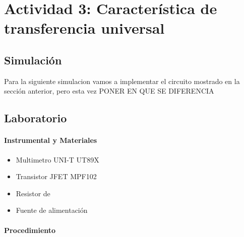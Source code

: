 \newpage

\section{Actividad 3: Característica de transferencia universal}

\subsection{Simulación}

Para la siguiente simulacion vamos a implementar el circuito mostrado en la sección anterior, pero esta vez PONER EN QUE SE DIFERENCIA

\subsection{Laboratorio}

\paragraph{Instrumental y Materiales}
\begin{itemize}
    \item Multimetro UNI-T UT89X
    \item Transistor JFET MPF102
    \item Resistor de
    \item Fuente de alimentación
\end{itemize}

\paragraph{Procedimiento}

\begin{table}[ht]
\end{table}

